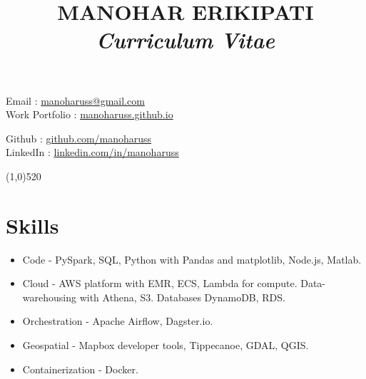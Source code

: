 \documentclass[11pt]{article}
\title{\bfseries MANOHAR ERIKIPATI \\ \large \textit {Curriculum Vitae}}
\date{}
\begin{document}
\maketitle

\vspace{-8.55em}
\begin{minipage}[ht]{0.58\textwidth}
Email : \href{manoharuss@gmail.com}{manoharuss@gmail.com} \\
Work Portfolio : \href{https://manoharuss.github.io/}{manoharuss.github.io}
\end{minipage}
\begin{minipage}[ht]{0.58\textwidth}
\hfill \break
\hfill \break
Github : \href{http://github.com/manoharuss}{github.com/manoharuss} \\
LinkedIn : \href{https://www.linkedin.com/in/manoharuss/}{linkedin.com/in/manoharuss} \\
\end{minipage}
\line(1,0){520}

\section*{Skills}
\begin{itemize}[noitemsep]
\item Code - PySpark, SQL, Python with Pandas and matplotlib, Node.js, Matlab.
\item Cloud - AWS platform with EMR, ECS, Lambda for compute. Data-warehousing with Athena, S3. Databases DynamoDB, RDS.
\item Orchestration - Apache Airflow, Dagster.io.
\item Geospatial - Mapbox developer tools, Tippecanoe, GDAL, QGIS.
\item Containerization - Docker.
\end{itemize}
\end{document}
